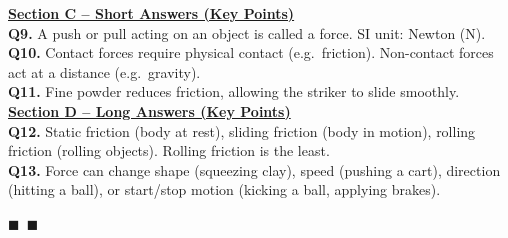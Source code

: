 \documentclass[12pt,a4paper]{article}
\begin{document}
\vspace{6pt}
\textbf{\underline{Section C -- Short Answers (Key Points)}}\\[3mm]
\textbf{Q9.} A push or pull acting on an object is called a force. SI unit: Newton (N).\\[2mm]
\textbf{Q10.} Contact forces require physical contact (e.g.\ friction). Non-contact forces act at a distance (e.g.\ gravity).\\[2mm]
\textbf{Q11.} Fine powder reduces friction, allowing the striker to slide smoothly.\\[2mm]

\vspace{6pt}
\textbf{\underline{Section D -- Long Answers (Key Points)}}\\[3mm]
\textbf{Q12.} Static friction (body at rest), sliding friction (body in motion), rolling friction (rolling objects). Rolling friction is the least.\\[2mm]
\textbf{Q13.} Force can change shape (squeezing clay), speed (pushing a cart), direction (hitting a ball), or start/stop motion (kicking a ball, applying brakes).\\[2mm]

\vspace{20pt}
\begin{center}
$\blacksquare$~$\blacksquare$
\end{center}
\end{document}
